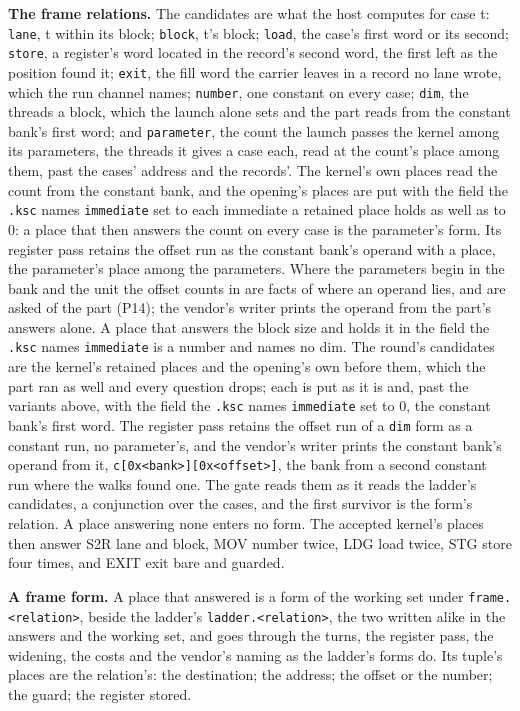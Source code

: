 \textbf{The frame relations.} The candidates are what the host computes for case t: \texttt{lane}, t within its block; \texttt{block}, t's block; \texttt{load}, the case's first word or its second; \texttt{store}, a register's word located in the record's second word, the first left as the position found it; \texttt{exit}, the fill word the carrier leaves in a record no lane wrote, which the run channel names; \texttt{number}, one constant on every case; \texttt{dim}, the threads a block, which the launch alone sets and the part reads from the constant bank's first word; and \texttt{parameter}, the count the launch passes the kernel among its parameters, the threads it gives a case each, read at the count's place among them, past the cases' address and the records'. The kernel's own places read the count from the constant bank, and the opening's places are put with the field the \texttt{.\allowbreak{}ksc} names \texttt{immediate} set to each immediate a retained place holds as well as to 0: a place that then answers the count on every case is the parameter's form. Its register pass retains the offset run as the constant bank's operand with a place, the parameter's place among the parameters. Where the parameters begin in the bank and the unit the offset counts in are facts of where an operand lies, and are asked of the part (P14); the vendor's writer prints the operand from the part's answers alone. A place that answers the block size and holds it in the field the \texttt{.\allowbreak{}ksc} names \texttt{immediate} is a number and names no dim. The round's candidates are the kernel's retained places and the opening's own before them, which the part ran as well and every question drops; each is put as it is and, past the variants above, with the field the \texttt{.\allowbreak{}ksc} names \texttt{immediate} set to 0, the constant bank's first word. The register pass retains the offset run of a \texttt{dim} form as a constant run, no parameter's, and the vendor's writer prints the constant bank's operand from it, \texttt{c[0x<bank>][0x<offset>]}, the bank from a second constant run where the walks found one. The gate reads them as it reads the ladder's candidates, a conjunction over the cases, and the first survivor is the form's relation. A place answering none enters no form. The accepted kernel's places then answer S2R lane and block, MOV number twice, LDG load twice, STG store four times, and EXIT exit bare and guarded.

\textbf{A frame form.} A place that answered is a form of the working set under \texttt{frame.\allowbreak{}<relation>}, beside the ladder's \texttt{ladder.\allowbreak{}<relation>}, the two written alike in the answers and the working set, and goes through the turns, the register pass, the widening, the costs and the vendor's naming as the ladder's forms do. Its tuple's places are the relation's: the destination; the address; the offset or the number; the guard; the register stored.

